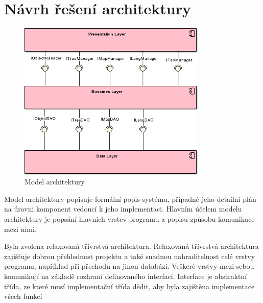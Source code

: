 \documentclass[thesis=B,czech]{resources/FITthesis}[2012/06/26]
\begin{document}
	\section{Návrh řešení architektury}
\begin{figure}\centering
	\includegraphics[width=0.8\textwidth]{images/architektura}
	\caption[Model architektury]{Model architektury}\label{fig:architektura}
\end{figure}
Model architektury popisuje formální popis systému, případně jeho detailní plán na úrovni komponent vedoucí k jeho implementaci. Hlavním účelem modelu architektury je popsání hlavních vrstev programu a popisu způsobu komunikace mezi nimi.\par

Byla zvolena relaxovaná třívrstvá architektura. Relaxovaná třívrstvá architektura zajišťuje dobrou přehlednost projektu a také snadnou nahraditelnost celé vrstvy programu, například při přechodu na jinou databázi. Veškeré vrstvy mezi sebou komunikují na základě rozhraní definovaného interfaci. Interface je abstraktní třída, ze které musí implementační třída dědit, aby byla zajištěna implementace všech funkcí
\end{document}

